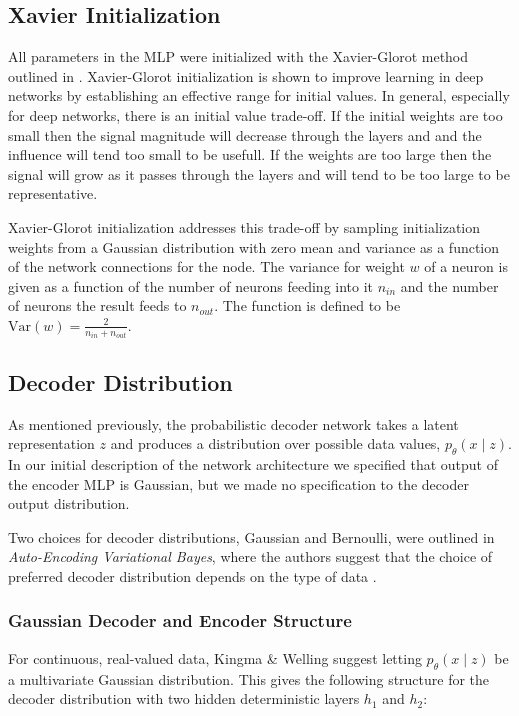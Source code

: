 \documentclass{article} %
\begin{document}
\subsection{Xavier Initialization}
All parameters in the MLP were initialized with the Xavier-Glorot method outlined in \cite{Glorot2010}. Xavier-Glorot initialization is shown to improve learning in deep networks by establishing an effective range for initial values. In general, especially for deep networks, there is an initial value trade-off. If the initial weights are too small then the signal magnitude will decrease through the layers and and the influence will tend too small to be usefull. If the weights are too large then the signal will grow as it passes through the layers and will tend to be too large to be representative.
\par Xavier-Glorot initialization addresses this trade-off by sampling initialization weights from a Gaussian distribution with zero mean and variance as a function of the network connections for the node. The variance for weight $w$  of a neuron is given as a function of the number of neurons feeding into it $n_{in}$ and the number of neurons the result feeds to $n_{out}$. The function is defined to be $\text{Var}(w) = \frac{2}{n_{in}+n_{out}}$.


\subsection{Decoder Distribution}
As mentioned previously, the probabilistic decoder network takes a latent representation $z$ and produces a distribution over possible data values, ${p_\theta(x\mid z)}$. In our initial description of the network architecture we specified that output of the encoder MLP is Gaussian, but we made no specification to the decoder output distribution.
\par Two choices for decoder distributions, Gaussian and Bernoulli, were outlined in \textit{Auto-Encoding Variational Bayes}, where the authors suggest that the choice of preferred decoder distribution depends on the type of data \cite{Kingma2013}. 

\subsubsection{Gaussian Decoder and Encoder Structure}
For continuous, real-valued data, Kingma \& Welling suggest letting ${p_\theta(x\mid z)}$ be a multivariate Gaussian distribution. This gives the following structure for the decoder distribution with two hidden deterministic layers $h_1$ and $h_2$:
\end{document}
